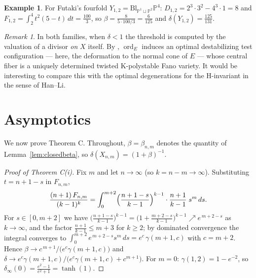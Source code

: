 \documentclass[11pt]{amsart}
\theoremstyle{definition}
\newtheorem{example}[theorem]{Example}
\theoremstyle{remark}
\newtheorem{remark}[theorem]{Remark}
\newcommand{\PP}{\mathbb{P}}
\newcommand{\Bl}{\mathrm{Bl}}
\newcommand{\ord}{\operatorname{ord}}
\begin{document}
\begin{example}\label{ex:futaki}
For Futaki's fourfold $Y_{1,2}=\Bl_{\PP^1\sqcup\PP^2}\PP^4$:
$D_{1,2}=2^3\cdot3^2-4^3\cdot1=8$ and
$F_{1,2}=\int_2^4t^2(5-t)\,dt=\tfrac{100}{3}$, so
$\beta=\tfrac{8}{5\cdot 100/3}=\tfrac{6}{125}$ and
$\delta(Y_{1,2})=\tfrac{125}{131}$.
\end{example}

\begin{remark}\label{rem:optimal}
In both families, when $\delta<1$ the threshold is computed by the
valuation of a divisor \emph{on} $X$ itself. By
\cite[Theorem 1.2]{BLZ22}, $\ord_E$ induces an optimal destabilizing
test configuration --- here, the deformation to the normal cone of $E$
--- whose central fiber is a uniquely determined twisted K-polystable
Fano variety. It would be interesting to compare this with the optimal
degenerations for the H-invariant in the sense of Han--Li.
\end{remark}

\section{Asymptotics}\label{sec:asymptotics}

We now prove Theorem C. Throughout, $\beta=\beta_{n,m}$ denotes the
quantity of Lemma~\ref{lem:closedbeta}, so
$\delta(X_{n,m})=(1+\beta)^{-1}$.

\begin{proof}[Proof of Theorem C(i)]
Fix $m$ and let $n\to\infty$ (so $k=n-m\to\infty$). Substituting
$t=n+1-s$ in $F_{n,m}$,
\[
\frac{(n+1)\,F_{n,m}}{(k-1)^{k}}
=\int_0^{m+2}\Bigl(\frac{n+1-s}{k-1}\Bigr)^{k-1}
\cdot\frac{n+1}{k-1}\;s^{m}\,ds .
\]
For $s\in[0,m+2]$ we have
$\bigl(\tfrac{n+1-s}{k-1}\bigr)^{k-1}
=\bigl(1+\tfrac{m+2-s}{k-1}\bigr)^{k-1}\nearrow e^{\,m+2-s}$
as $k\to\infty$, and the factor $\tfrac{n+1}{k-1}\le m+3$ for
$k\ge2$; by dominated convergence the integral converges to
$\int_0^{m+2}e^{\,m+2-s}s^m\,ds=e^{c}\,\gamma(m+1,c)$ with $c=m+2$.
Hence $\beta\to c^{\,m+1}/\bigl(e^{c}\gamma(m+1,c)\bigr)$ and
$\delta\to e^{c}\gamma(m+1,c)/\bigl(e^{c}\gamma(m+1,c)+c^{m+1}\bigr)$.
For $m=0$: $\gamma(1,2)=1-e^{-2}$, so
$\delta_\infty(0)=\frac{e^{2}-1}{e^{2}+1}=\tanh(1)$.
\end{proof}
\end{document}
